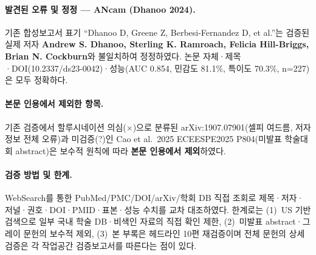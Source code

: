 \documentclass[11pt,a4paper]{article}
\begin{document}
\paragraph{발견된 오류 및 정정 --- ANcam (Dhanoo 2024).}
기존 합성보고서 표기 ``Dhanoo D, Greene Z, Berbesi-Fernandez D, et al.''는 검증된 실제 저자 \textbf{Andrew S. Dhanoo, Sterling K. Ramroach, Felicia Hill-Briggs, Brian N. Cockburn}와 불일치하여 정정하였다. 논문 자체·제목·DOI(10.2337/ds23-0042)·성능(AUC 0.854, 민감도 81.1\%, 특이도 70.3\%, n=227)은 모두 정확하다.

\paragraph{본문 인용에서 제외한 항목.}
기존 검증에서 할루시네이션 의심($\times$)으로 분류된 arXiv:1907.07901(셀피 여드름, 저자 정보 전체 오류)과 미검증(?)인 Cao et al.\ 2025 ECEESPE2025 P804(미발표 학술대회 abstract)은 보수적 원칙에 따라 \textbf{본문 인용에서 제외}하였다.

\paragraph{검증 방법 및 한계.}
WebSearch를 통한 PubMed/PMC/DOI/arXiv/학회 DB 직접 조회로 제목·저자·저널·권호·DOI·PMID·표본·성능 수치를 교차 대조하였다. 한계로는 (1)~US 기반 검색으로 일부 국내 학술 DB·비색인 자료의 직접 확인 제한, (2)~미발표 abstract·그레이 문헌의 보수적 제외, (3)~본 부록은 헤드라인 10편 재검증이며 전체 문헌의 상세 검증은 각 작업공간 검증보고서를 따른다는 점이 있다.
\end{document}

